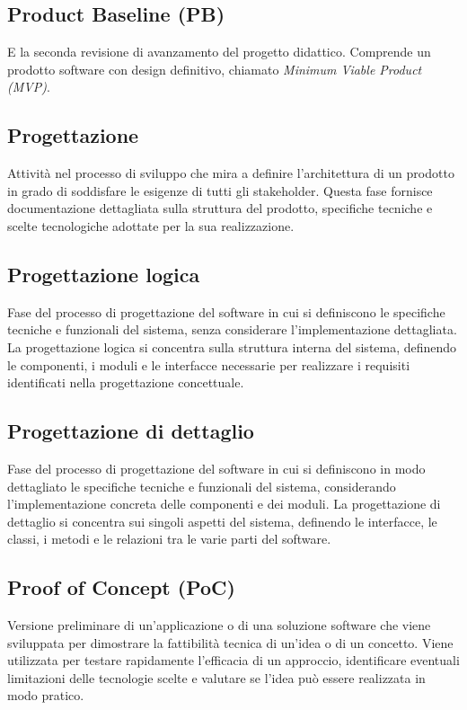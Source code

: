 \hypertarget{sec:PB}{}
\subsection*{Product Baseline (PB)}
E la seconda revisione di avanzamento del progetto didattico. Comprende un prodotto software con design definitivo, 
chiamato \emph{Minimum Viable Product (MVP)}.

\hypertarget{sec:progettazione}{}
\subsection*{Progettazione}
Attività nel processo di sviluppo che mira a definire l'architettura di un prodotto in grado di soddisfare le esigenze di tutti gli stakeholder. 
Questa fase fornisce documentazione dettagliata sulla struttura del prodotto, specifiche tecniche e scelte tecnologiche adottate per la sua realizzazione.

\hypertarget{sec:progettazione_logica}{}
\subsection*{Progettazione logica}
Fase del processo di progettazione del software in cui si definiscono le specifiche tecniche e funzionali del sistema, senza considerare l'implementazione
dettagliata. La progettazione logica si concentra sulla struttura interna del sistema, definendo le componenti, i moduli e le interfacce necessarie per
realizzare i requisiti identificati nella progettazione concettuale.

\hypertarget{sec:progettazione_dettaglio}{}
\subsection*{Progettazione di dettaglio}
Fase del processo di progettazione del software in cui si definiscono in modo dettagliato le specifiche tecniche e funzionali del sistema, considerando
l'implementazione concreta delle componenti e dei moduli. La progettazione di dettaglio si concentra sui singoli aspetti del sistema, definendo le
interfacce, le classi, i metodi e le relazioni tra le varie parti del software.

\hypertarget{sec:PoC}{}
\subsection*{Proof of Concept (PoC)}
Versione preliminare di un’applicazione o di una soluzione software che viene sviluppata per dimostrare la fattibilità tecnica di un’idea o di un concetto. 
Viene utilizzata per testare rapidamente l’efficacia di un approccio, identificare eventuali limitazioni delle tecnologie scelte e valutare se l’idea può 
essere realizzata in modo pratico.

